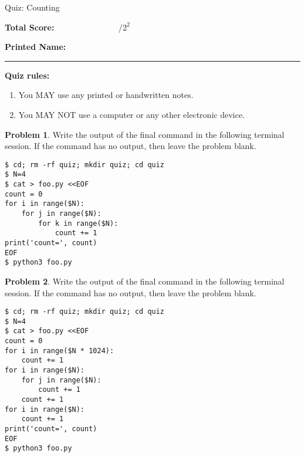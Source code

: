 \documentclass[10pt]{article}
\theoremstyle{definition}
\newtheorem{problem}{Problem}
\begin{document}
\begin{center}
    {
\Large
    Quiz: Counting
}


    \vspace{0.1in}
\end{center}

\vspace{0.15in}
\noindent
\textbf{Total Score:} ~~~~~~~~~~~~~~~/$2^2$

\vspace{0.2in}
\noindent
\textbf{Printed Name:}

\noindent
\rule{\textwidth}{0.1pt}
\vspace{0.15in}

\noindent
\textbf{Quiz rules:}
\begin{enumerate}
    \item You MAY use any printed or handwritten notes.
    \item You MAY NOT use a computer or any other electronic device.
\end{enumerate}

\noindent

\vspace{0.15in}

\filbreak
\begin{problem}
    Write the output of the final command in the following terminal session.
    If the command has no output, then leave the problem blank.
\end{problem}
\begin{lstlisting}
$ cd; rm -rf quiz; mkdir quiz; cd quiz
$ N=4
$ cat > foo.py <<EOF
count = 0
for i in range($N):
    for j in range($N):
        for k in range($N):
            count += 1
print('count=', count)
EOF
$ python3 foo.py
\end{lstlisting}
\vspace{0.4in}


\newpage
\begin{problem}
    Write the output of the final command in the following terminal session.
    If the command has no output, then leave the problem blank.
\end{problem}
\begin{lstlisting}
$ cd; rm -rf quiz; mkdir quiz; cd quiz
$ N=4
$ cat > foo.py <<EOF
count = 0
for i in range($N * 1024):
    count += 1
for i in range($N):
    for j in range($N):
        count += 1
    count += 1
for i in range($N):
    count += 1
print('count=', count)
EOF
$ python3 foo.py
\end{lstlisting}
\vspace{0.4in}
\end{document}
